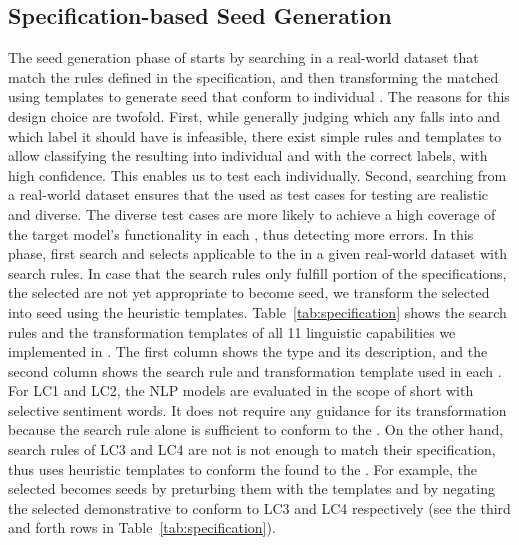 \subsection{Specification-based Seed Generation}
The seed generation phase of \tool starts by searching \sents in a
real-world dataset that match the rules defined in the \lc
specification, and then transforming the matched \sents using
templates to generate seed \sents that conform to individual
\lcs. The reasons for this design choice are twofold.  First, while
generally judging which \lc any \sent falls into and which label it
should have is infeasible, there exist simple rules and templates to
allow classifying the resulting \sents into individual \lcs and
with the correct labels, with high confidence.  This enables us to
test each \lc individually.  Second, searching from a real-world
dataset ensures that the \sents used as test cases for testing \lcs
are realistic and diverse. The diverse test cases are more likely to
achieve a high coverage of the target model's functionality in each
\lc, thus detecting more errors.
%
In this phase, \tool first search and selects \sents applicable to
the \lc in a given real-world dataset with search rules. In case that
the search rules only fulfill portion of the \lc specifications, the
selected \sents are not yet appropriate to become seed, we
transform the selected \sents into seed \sents using the
heuristic templates.
%
Table~\ref{tab:specification} shows the search rules and the
transformation templates of all 11 linguistic capabilities we
implemented in \tool. The first column shows the \lc type and its
description, and the second column shows the search rule and
transformation template used in each \lc. For LC1 and LC2, the NLP
models are evaluated in the scope of short \sents with selective
sentiment words. It does not require any guidance for its
transformation because the search rule alone is sufficient to conform
to the \lcs. On the other hand, search rules of LC3 and LC4 are not is
not enough to match their \lc specification, thus \tool uses heuristic
templates to conform the found \sents to the \lc. For example, the
selected \sents becomes seeds by preturbing them with the templates
and by negating the selected demonstrative \sents to conform to LC3
and LC4 respectively (see the third and forth rows in
Table~\ref{tab:specification}).
 

